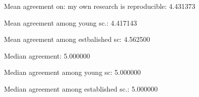 
Mean agreement on: my own research is reproducible: 4.431373

Mean agreement among young sc.: 4.417143

Mean agreement among estbalished sc: 4.562500

Median agreement: 5.000000

Median agreement among young sc: 5.000000

Median agreement among established sc.: 5.000000
